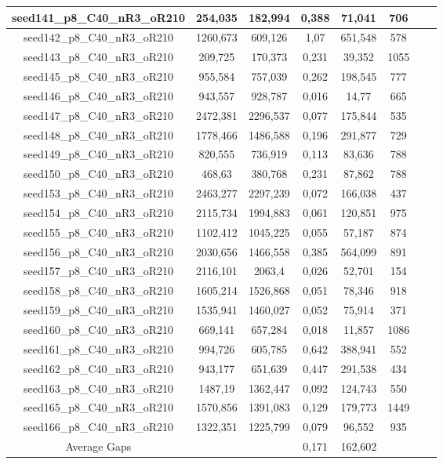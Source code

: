 \documentclass[a4paper]{article}
\begin{document}
\begin{center}
\begin{longtable}{cccccccc}
\hline
seed141\_p8\_C40\_nR3\_oR210 & 254,035 & 182,994 & 0,388 & 71,041 & 706\\
\hline
seed142\_p8\_C40\_nR3\_oR210 & 1260,673 & 609,126 & 1,07 & 651,548 & 578\\
\hline
seed143\_p8\_C40\_nR3\_oR210 & 209,725 & 170,373 & 0,231 & 39,352 & 1055\\
\hline
seed145\_p8\_C40\_nR3\_oR210 & 955,584 & 757,039 & 0,262 & 198,545 & 777\\
\hline
seed146\_p8\_C40\_nR3\_oR210 & 943,557 & 928,787 & 0,016 & 14,77 & 665\\
\hline
seed147\_p8\_C40\_nR3\_oR210 & 2472,381 & 2296,537 & 0,077 & 175,844 & 535\\
\hline
seed148\_p8\_C40\_nR3\_oR210 & 1778,466 & 1486,588 & 0,196 & 291,877 & 729\\
\hline
seed149\_p8\_C40\_nR3\_oR210 & 820,555 & 736,919 & 0,113 & 83,636 & 788\\
\hline
seed150\_p8\_C40\_nR3\_oR210 & 468,63 & 380,768 & 0,231 & 87,862 & 788\\
\hline
seed153\_p8\_C40\_nR3\_oR210 & 2463,277 & 2297,239 & 0,072 & 166,038 & 437\\
\hline
seed154\_p8\_C40\_nR3\_oR210 & 2115,734 & 1994,883 & 0,061 & 120,851 & 975\\
\hline
seed155\_p8\_C40\_nR3\_oR210 & 1102,412 & 1045,225 & 0,055 & 57,187 & 874\\
\hline
seed156\_p8\_C40\_nR3\_oR210 & 2030,656 & 1466,558 & 0,385 & 564,099 & 891\\
\hline
seed157\_p8\_C40\_nR3\_oR210 & 2116,101 & 2063,4 & 0,026 & 52,701 & 154\\
\hline
seed158\_p8\_C40\_nR3\_oR210 & 1605,214 & 1526,868 & 0,051 & 78,346 & 918\\
\hline
seed159\_p8\_C40\_nR3\_oR210 & 1535,941 & 1460,027 & 0,052 & 75,914 & 371\\
\hline
seed160\_p8\_C40\_nR3\_oR210 & 669,141 & 657,284 & 0,018 & 11,857 & 1086\\
\hline
seed161\_p8\_C40\_nR3\_oR210 & 994,726 & 605,785 & 0,642 & 388,941 & 552\\
\hline
seed162\_p8\_C40\_nR3\_oR210 & 943,177 & 651,639 & 0,447 & 291,538 & 434\\
\hline
seed163\_p8\_C40\_nR3\_oR210 & 1487,19 & 1362,447 & 0,092 & 124,743 & 550\\
\hline
seed165\_p8\_C40\_nR3\_oR210 & 1570,856 & 1391,083 & 0,129 & 179,773 & 1449\\
\hline
seed166\_p8\_C40\_nR3\_oR210 & 1322,351 & 1225,799 & 0,079 & 96,552 & 935\\
\hline
\hline
Average Gaps & & & 0,171 & 162,602 &  \\
\hline
\hline
\end{longtable}
\end{center}
\end{document}
